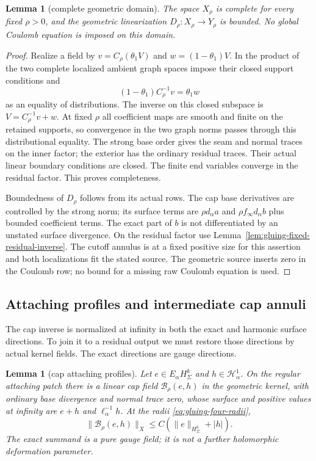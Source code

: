 \documentclass[11pt]{amsart}
\newtheorem{lemma}[theorem]{Lemma}
\theoremstyle{definition}
\theoremstyle{remark}
\theoremstyle{plain}
\begin{document}
\begin{lemma}[complete geometric domain]\label{lem:gluing-complete-domain}
The space $X_\rho$ is complete for every fixed $\rho>0$, and the
geometric linearization $D_\rho:X_\rho\to Y_\rho$ is bounded.
No global Coulomb equation is imposed on this domain.
\end{lemma}

\begin{proof}
Realize a field by $v=C_\rho(\theta_1V)$ and
$w=(1-\theta_1)V$. In the product of the two complete localized
ambient graph spaces impose their closed support conditions and
\[
                        (1-\theta_1)C_\rho^{-1}v=\theta_1w
\]
as an equality of distributions. The inverse on this closed subspace
is $V=C_\rho^{-1}v+w$. At fixed $\rho$ all coefficient maps
are smooth and finite on the retained supports, so convergence in
the two graph norms passes through this distributional equality.
The strong base order gives the seam and normal traces on the inner
factor; the exterior has the ordinary residual traces. Their actual
linear boundary conditions are closed. The finite end variables
converge in the residual factor. This proves completeness.

Boundedness of $D_\rho$ follows from its actual rows. The cap base
derivatives are controlled by the strong norm; its surface terms
are $\rho d_\alpha a$ and $\rho f_\infty d_\alpha b$ plus
bounded coefficient terms. The exact part of $b$ is not differentiated
by an unstated surface divergence. On the residual factor use
Lemma~\ref{lem:gluing-fixed-residual-inverse}. The cutoff annulus
is at a fixed positive size for this assertion and both localizations
fit the stated source. The geometric source inserts zero in the
Coulomb row; no bound for a missing raw Coulomb equation is used.
\end{proof}

\subsection{Attaching profiles and intermediate cap annuli}

The cap inverse is normalized at infinity in both the exact and
harmonic surface directions. To join it to a residual output we must
restore those directions by actual kernel fields. The exact directions
are gauge directions.

\begin{lemma}[cap attaching profiles]\label{lem:gluing-cap-profiles}
Let $e\in E_\alpha H^k_\Sigma$ and $h\in\mathcal H^1_\alpha$.
On the regular attaching patch there is a linear cap field
$\mathcal B_\rho(e,h)$ in the geometric kernel, with ordinary base
divergence and normal trace zero, whose surface and positive values
at infinity are $e+h$ and $\ell_\alpha^{-1}h$. At the radii
\eqref{eq:gluing-four-radii},
\[
                \|\mathcal B_\rho(e,h)\|_X
                              \leq C(\|e\|_{H^k_\Sigma}+|h|).
\]
The exact summand is a pure gauge field; it is not a further
holomorphic deformation parameter.
\end{lemma}
\end{document}

